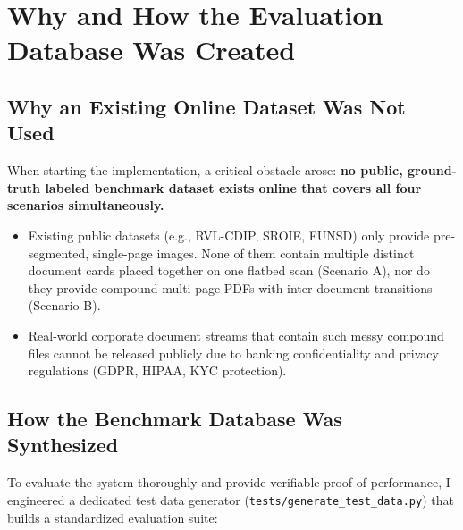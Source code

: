 \documentclass[11pt,a4paper]{article}
\begin{document}
\section{Why and How the Evaluation Database Was Created}
\subsection{Why an Existing Online Dataset Was Not Used}
When starting the implementation, a critical obstacle arose: \textbf{no public, ground-truth labeled benchmark dataset exists online that covers all four scenarios simultaneously.}
\begin{itemize}[leftmargin=*, noitemsep]
    \item Existing public datasets (e.g., RVL-CDIP, SROIE, FUNSD) only provide pre-segmented, single-page images. None of them contain multiple distinct document cards placed together on one flatbed scan (Scenario A), nor do they provide compound multi-page PDFs with inter-document transitions (Scenario B).
    \item Real-world corporate document streams that contain such messy compound files cannot be released publicly due to banking confidentiality and privacy regulations (GDPR, HIPAA, KYC protection).
\end{itemize}

\subsection{How the Benchmark Database Was Synthesized}
To evaluate the system thoroughly and provide verifiable proof of performance, I engineered a dedicated test data generator (\texttt{tests/generate\_test\_data.py}) that builds a standardized evaluation suite:
\end{document}

